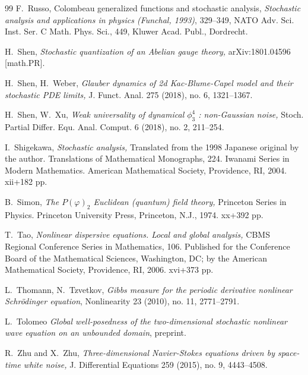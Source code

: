 \documentclass[%
11pt,  reqno]{amsart}
\newcommand{\1}{\hspace{0.2mm}\text{I}\hspace{0.2mm}}
\numberwithin{equation}{section}
\numberwithin{theorem}{section}
\begin{document}
\begin{thebibliography}{99}
F.~Russo, 
 Colombeau generalized functions and stochastic analysis,  {\it Stochastic analysis and applications in physics (Funchal, 1993)}, 329--349, NATO Adv. Sci. Inst. Ser. C Math. Phys. Sci., 449, Kluwer Acad. Publ., Dordrecht. 

H.~Shen,
{\it Stochastic quantization of an {Abelian} gauge theory,}
arXiv:1801.04596 [math.PR].


H.~Shen, H.~Weber,
{\it Glauber dynamics of 2d {Kac}-{Blume}-{Capel} model and their
  stochastic {PDE} limits,}
 J. Funct. Anal. 275 (2018), no. 6, 1321--1367.

H.~Shen, W.~Xu,
{\it Weak universality of dynamical $\phi^4_3$ : non-{Gaussian} noise,}
 Stoch. Partial Differ. Equ. Anal. Comput. 6 (2018), no. 2, 211--254. 



I.~Shigekawa, 
{\it Stochastic analysis,}
Translated from the 1998 Japanese original by the author. Translations of Mathematical Monographs, 224. Iwanami Series in Modern Mathematics. American Mathematical Society, Providence, RI, 2004. xii+182 pp.

B.~Simon, 
{\it  The $P(\varphi)_2$ Euclidean (quantum) field theory,} Princeton Series in Physics. Princeton University Press, Princeton, N.J., 1974. xx+392 pp.


T.~Tao, {\it Nonlinear dispersive equations. Local and global analysis,} CBMS Regional Conference Series in Mathematics, 106. Published for the Conference Board of the Mathematical Sciences, Washington, DC; by the American Mathematical Society, Providence, RI, 2006. xvi+373 pp.

L.~Thomann, N.~Tzvetkov, 
{\it Gibbs measure for the periodic derivative nonlinear Schr\"odinger equation},
 Nonlinearity 23 (2010), no. 11, 2771--2791.


L.~Tolomeo
{\it Global well-posedness of the two-dimensional stochastic nonlinear wave equation on an unbounded domain},
preprint.


R.~Zhu and X.~Zhu,
{\it Three-dimensional {Navier}-{Stokes} equations driven by space-time
  white noise,}
 J. Differential Equations 259 (2015), no. 9, 4443--4508.


\end{thebibliography}
\end{document}
